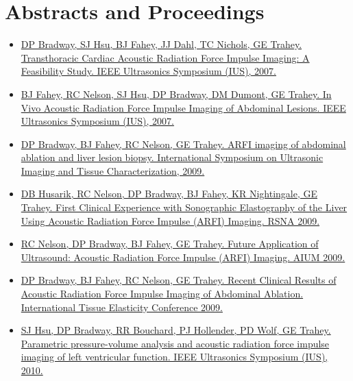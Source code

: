 \documentclass[letterpaper,10pt,english]{sphinxmanual}
\begin{document}
\section{Abstracts and Proceedings}
\label{resume:abstracts-and-proceedings}\begin{itemize}
\item {} 
\href{http://dx.doi.org/10.1109/ULTSYM.2007.121}{DP Bradway, SJ Hsu, BJ Fahey, JJ Dahl, TC Nichols, GE Trahey.
Transthoracic Cardiac Acoustic Radiation Force Impulse Imaging: A
Feasibility Study. IEEE Ultrasonics Symposium (IUS),
2007.}

\item {} 
\href{http://dx.doi.org/10.1109/ULTSYM.2007.119}{BJ Fahey, RC Nelson, SJ Hsu, DP Bradway, DM Dumont, GE Trahey. In
Vivo Acoustic Radiation Force Impulse Imaging of Abdominal Lesions.
IEEE Ultrasonics Symposium (IUS),
2007.}

\item {} 
\href{http://uitc-symposium.org/2009\_abstracts.pdf}{DP Bradway, BJ Fahey, RC Nelson, GE Trahey. ARFI imaging of
abdominal ablation and liver lesion biopsy. International Symposium
on Ultrasonic Imaging and Tissue Characterization,
2009.}

\item {} 
\href{http://rsna2009.rsna.org/search/}{DB Husarik, RC Nelson, DP Bradway, BJ Fahey, KR Nightingale, GE
Trahey. First Clinical Experience with Sonographic Elastography of
the Liver Using Acoustic Radiation Force Impulse (ARFI) Imaging. RSNA
2009.}

\item {} 
\href{http://www.aium.org/loginRequired/membersOnly/proceedings/2009.pdf}{RC Nelson, DP Bradway, BJ Fahey, GE Trahey. Future Application of
Ultrasound: Acoustic Radiation Force Impulse (ARFI) Imaging. AIUM
2009.}

\item {} 
\href{http://www.elasticityconference.org/prior\_conf/2009/PDF/2009Proceedings.pdf}{DP Bradway, BJ Fahey, RC Nelson, GE Trahey. Recent Clinical Results
of Acoustic Radiation Force Impulse Imaging of Abdominal Ablation.
International Tissue Elasticity Conference
2009.}

\item {} 
\href{http://dx.doi.org/10.1109/ULTSYM.2010.5935661}{SJ Hsu, DP Bradway, RR Bouchard, PJ Hollender, PD Wolf, GE Trahey.
Parametric pressure-volume analysis and acoustic radiation force
impulse imaging of left ventricular function. IEEE Ultrasonics
Symposium (IUS),
2010.}


\end{itemize}
\end{document}
